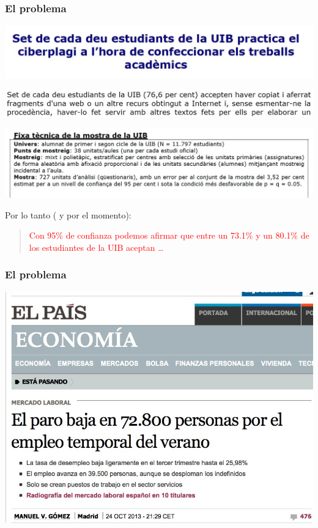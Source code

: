 \documentclass[12pt,t]{beamer}\usepackage[]{graphicx}\usepackage[]{color}
\newcommand{\red}[1]{\textcolor{red}{#1}}
\theoremstyle{plain}
\theoremstyle{definition}
\begin{document}
\begin{frame}
\frametitle{El problema}
\vspace*{-1cm}

\begin{center}
\hspace*{-0.5cm}
\includegraphics[width=1.1\linewidth]{plagiUIB1.jpg}\medskip

\hspace*{-0.4cm}
\includegraphics[width=1.05\linewidth]{plagiUIB3.jpg}\medskip

\hspace*{-0.5cm}\includegraphics[width=1.1\linewidth]{plagiUIB2.jpg}
\end{center}
\vspace*{-1ex}

Por lo tanto ( y por el momento):
\begin{quote}
\red{Con 95\% de confianza podemos afirmar que entre un 73.1\% y un 80.1\% de los estudiantes de la UIB aceptan \ldots}
\end{quote}
\end{frame}


\begin{frame}
\frametitle{El problema}
\vspace*{-0.5cm}

\begin{center}
\includegraphics[width=1\linewidth]{EPA3}
\end{center}
\end{frame}
\end{document}
